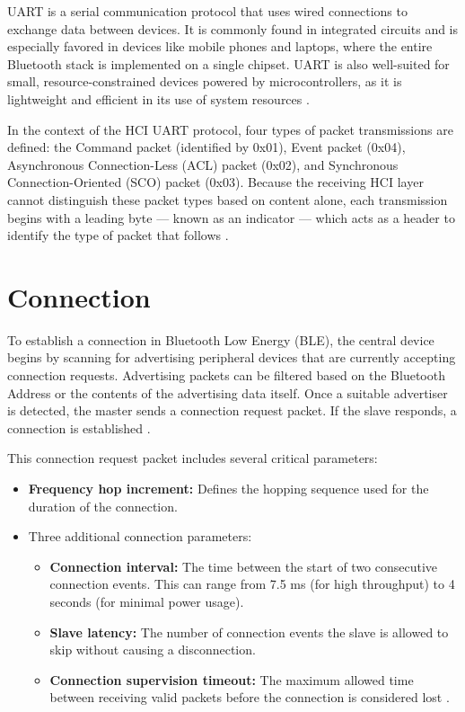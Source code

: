 UART is a serial communication protocol that uses wired connections to exchange data between devices. It is commonly found in integrated circuits and is especially favored in devices like mobile phones and laptops, where the entire Bluetooth stack is implemented on a single chipset. UART is also well-suited for small, resource-constrained devices powered by microcontrollers, as it is lightweight and efficient in its use of system resources \cite{nextgenBLE}.

In the context of the HCI UART protocol, four types of packet transmissions are defined: the Command packet (identified by 0x01), Event packet (0x04), Asynchronous Connection-Less (ACL) packet (0x02), and Synchronous Connection-Oriented (SCO) packet (0x03). Because the receiving HCI layer cannot distinguish these packet types based on content alone, each transmission begins with a leading byte — known as an indicator — which acts as a header to identify the type of packet that follows \cite{nextgenBLE}.

\section{Connection}

To establish a connection in Bluetooth Low Energy (BLE), the central device begins by scanning for advertising peripheral devices that are currently accepting connection requests. Advertising packets can be filtered based on the Bluetooth Address or the contents of the advertising data itself. Once a suitable advertiser is detected, the master sends a connection request packet. If the slave responds, a connection is established \cite{gettingstartedwble}.

This connection request packet includes several critical parameters:
\begin{itemize}
    \item \textbf{Frequency hop increment:} Defines the hopping sequence used for the duration of the connection.
    \item Three additional connection parameters:
    \begin{itemize}
        \item \textbf{Connection interval:} The time between the start of two consecutive connection events. This can range from 7.5 ms (for high throughput) to 4 seconds (for minimal power usage).
        \item \textbf{Slave latency:} The number of connection events the slave is allowed to skip without causing a disconnection.
        \item \textbf{Connection supervision timeout:} The maximum allowed time between receiving valid packets before the connection is considered lost \cite{gettingstartedwble}.
    \end{itemize}
\end{itemize}

